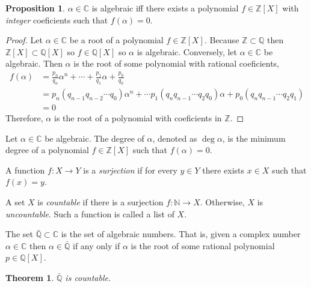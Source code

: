 \documentclass{article}
\newcommand{\Z}{\mathbb{Z}}
\newcommand{\N}{\mathbb{N}}
\newcommand{\C}{\mathbb{C}}
\newcommand{\Q}{\mathbb{Q}}
\newenvironment{definition}[1][Definition:]{\begin{trivlist}
\item[\hskip \labelsep {\bfseries #1}]}{\end{trivlist}}
\theoremstyle{theorem}
\newtheorem{theorem}{Theorem}[section]
\theoremstyle{definition}
\theoremstyle{definition}
\newtheorem*{proposition}{Proposition}
\theoremstyle{remark}
\theoremstyle{definition}
\theoremstyle{remark}
\begin{document}
\begin{proposition}
$\alpha \in \C$ is algebraic iff there exists a polynomial $f \in \Z[X]$ with \textit{integer} coeficients such that $f(\alpha) = 0$. 
\end{proposition}

\begin{proof}
Let $\alpha \in \C$ be a root of a polynomial $f \in \Z[X]$. Because $\Z \subset \Q$ then $\Z[X] \subset \Q[X]$ so $f \in \Q[X]$ so $\alpha$ is algebraic. Conversely, let $\alpha \in \C$ be algebraic. Then $\alpha$ is the root of some polynomial with rational coeficients, 
\begin{align*}
f(\alpha) &= \frac{p_n}{q_n} \alpha^n + \cdots + \frac{p_1}{q_1} \alpha + \frac{p_0}{q_0} \\ & = p_n (q_{n-1} q_{n-2} \cdots q_0) \alpha^n + \cdots p_1 (q_n q_{n-1} \cdots q_{2} q_0) \alpha + p_0 (q_{n} q_{n-1} \cdots q_2 q_1) \\ & = 0 
\end{align*}
Therefore, $\alpha$ is the root of a polynomial with coeficients in $\Z$. 
\end{proof}

\begin{definition}
Let $\alpha \in \C$ be algebraic. The degree of $\alpha$, denoted as $\deg{\alpha}$, is the minimum degree of a polynomial $f \in \Z[X]$ such that $f(\alpha) = 0$.  
\end{definition}

\begin{definition}
A function $f : X \to Y$ is a \textit{surjection} if for every $y \in Y$ there exists $x \in X$ such that $f(x) = y$. 
\end{definition}

\begin{definition}
A set $X$ is \textit{countable} if there is a surjection $f : \N \to X$. Otherwise, $X$ is \textit{uncountable}. Such a function is called a list of $X$. 
\end{definition}

\begin{definition}
The set $\bar{\Q} \subset \C$ is the set of algebraic numbers. That is, given a complex number $\alpha \in \C$ then $\alpha \in \bar{\Q}$ if any only if $\alpha$ is the root of some rational polynomial $p \in \Q[X]$. 
\end{definition}

\begin{theorem}
$\bar{\Q}$ is countable.
\end{theorem}
\end{document}
